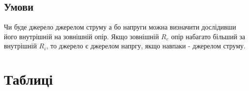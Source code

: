 \documentclass[a4paper,12pt]{article}
\begin{document}
\begin{justify}
	\subsection{Умови}
	Чи буде джерело джерелом струму а бо напруги можна визначити дослідивши його внутрішній на зовнішній опір. Якщо зовнішній $R_e$ опір набагато більший за внутрішній $R_i$, то джерело є джерелом напргу, якщо навпаки - джерелом струму.
	
\end{justify}


	\newpage
	\recalctypearea
	\section{Таблиці}
\end{document}
